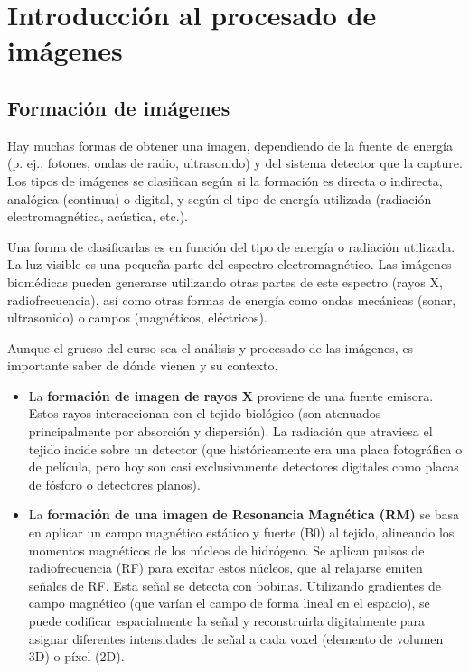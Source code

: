 \chapter{Introducción al procesado de imágenes}
\section{Formación de imágenes}
Hay muchas formas de obtener una imagen, dependiendo de la fuente de energía (p. ej., fotones, ondas de radio, ultrasonido) y del sistema detector que la capture. Los tipos de imágenes se clasifican según si la formación es directa o indirecta, analógica (continua) o digital, y según el tipo de energía utilizada (radiación electromagnética, acústica, etc.).

Una forma de clasificarlas es en función del tipo de energía o radiación utilizada. La luz visible es una pequeña parte del espectro electromagnético. Las imágenes biomédicas pueden generarse utilizando otras partes de este espectro (rayos X, radiofrecuencia), así como otras formas de energía como ondas mecánicas (sonar, ultrasonido) o campos (magnéticos, eléctricos).

Aunque el grueso del curso sea el análisis y procesado de las imágenes, es importante saber de dónde vienen y su contexto.
\begin{itemize}
\item La \textbf{formación de imagen de rayos X} proviene de una fuente emisora. Estos rayos interaccionan con el tejido biológico (son atenuados principalmente por absorción y dispersión). La radiación que atraviesa el tejido incide sobre un detector (que históricamente era una placa fotográfica o de película, pero hoy son casi exclusivamente detectores digitales como placas de fósforo o detectores planos).
\item La \textbf{formación de una imagen de Resonancia Magnética (RM)} se basa en aplicar un campo magnético estático y fuerte (B0) al tejido, alineando los momentos magnéticos de los núcleos de hidrógeno. Se aplican pulsos de radiofrecuencia (RF) para excitar estos núcleos, que al relajarse emiten señales de RF. Esta señal se detecta con bobinas. Utilizando gradientes de campo magnético (que varían el campo de forma lineal en el espacio), se puede codificar espacialmente la señal y reconstruirla digitalmente para asignar diferentes intensidades de señal a cada voxel (elemento de volumen 3D) o píxel (2D).
\end{itemize}

